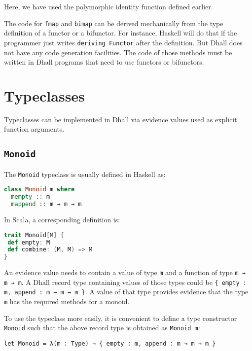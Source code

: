 Here, we have used the polymorphic identity function defined earlier.


The code for \lstinline!fmap! and \lstinline!bimap! can be derived mechanically from the type definition of a functor or a bifunctor.
For instance, Haskell will do that if the programmer just writes \lstinline!deriving Functor! after the definition.
But Dhall does not have any code generation facilities.
The code of those methods must be written in Dhall programs that need to use functors or bifunctors.


\section{Typeclasses}


Typeclasses can be implemented in Dhall via evidence values used as explicit function arguments.


\subsection{\lstinline!Monoid!}


The \lstinline!Monoid! typeclass is usually defined in Haskell as:


\begin{lstlisting}[language=Haskell]
class Monoid m where
  mempty :: m
  mappend :: m → m → m
\end{lstlisting}


In Scala, a corresponding definition is:


\begin{lstlisting}[language=Scala]
trait Monoid[M] {
 def empty: M
 def combine: (M, M) => M 
}
\end{lstlisting}


An evidence value needs to contain a value of type \lstinline!m! and a function of type \lstinline!m → m → m!.
A Dhall record type containing values of those types could be \lstinline!{ empty : m, append : m → m → m }!.
A value of that type provides evidence that the type \lstinline!m! has the required methods for a monoid.


To use the typeclass more easily, it is convenient to define a type constructor \lstinline!Monoid! such that the above record type is obtained as \lstinline!Monoid m!:


\begin{lstlisting}[language=Dhall]
let Monoid = λ(m : Type) → { empty : m, append : m → m → m }
\end{lstlisting}


